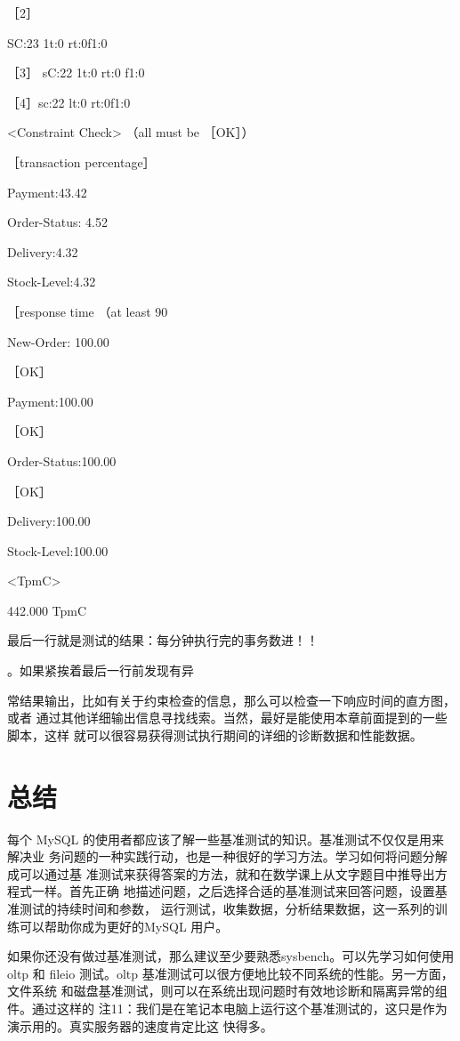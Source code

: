 ［2］

SC:23 1t:0 rt:0f1:0

［3］ sC:22 1t:0 rt:0 f1:0

［4］sc:22 lt:0 rt:0f1:0

<Constraint Check> （all must be ［OK］）

［transaction percentage］

Payment:43.42%

Order-Status: 4.52%

Delivery:4.32%

Stock-Level:4.32%

［response time （at least 90%

New-Order: 100.00%

［OK］

Payment:100.00%

［OK］

Order-Status:100.00%

［OK］

Delivery:100.00%

Stock-Level:100.00%

<TpmC>

442.000 TpmC

最后一行就是测试的结果：每分钟执行完的事务数进！！

。如果紧挨着最后一行前发现有异

常结果输出，比如有关于约束检查的信息，那么可以检查一下响应时间的直方图，或者
通过其他详细输出信息寻找线索。当然，最好是能使用本章前面提到的一些脚本，这样
就可以很容易获得测试执行期间的详细的诊断数据和性能数据。

\section{总结}
每个 MySQL 的使用者都应该了解一些基准测试的知识。基准测试不仅仅是用来解决业
务问题的一种实践行动，也是一种很好的学习方法。学习如何将问题分解成可以通过基
准测试来获得答案的方法，就和在数学课上从文字题目中推导出方程式一样。首先正确
地描述问题，之后选择合适的基准测试来回答问题，设置基准测试的持续时间和参数，
运行测试，收集数据，分析结果数据，这一系列的训练可以帮助你成为更好的MySQL
用户。

如果你还没有做过基准测试，那么建议至少要熟悉sysbench。可以先学习如何使用 oltp
和 fileio 测试。oltp 基准测试可以很方便地比较不同系统的性能。另一方面，文件系统
和磁盘基准测试，则可以在系统出现问题时有效地诊断和隔离异常的组件。通过这样的
注11：我们是在笔记本电脑上运行这个基准测试的，这只是作为演示用的。真实服务器的速度肯定比这
快得多。

